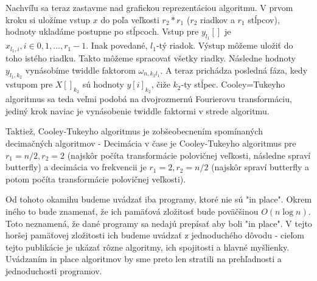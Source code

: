 Nachvíľu sa teraz zastavme nad grafickou reprezentáciou algoritmu.
V prvom kroku si uložíme vstup $x$ do poľa veľkosti $r_2*r_1$ ($r_2$ riadkov a
$r_1$ stĺpcov), hodnoty ukladáme postupne po stĺpcoch.
Vstup pre $y_{l_1}[]$ je $x_{l_1,i}, i\in0,1,\dots,r_1-1$. Inak
povedané, $l_1$-tý riadok. Výstup môžeme uložiť do toho istého riadku.
Takto môžeme spracovať všetky riadky.
Následne hodnoty $y_{l_1, k_2}$ vynásobíme twiddle faktorom
$\omega_{n, k_2 l_1}$.
A teraz prichádza posledná fáza, kedy vstupom pre
 $X[]_{k_2}$ sú hodnoty $y[i]_{k_2}$, čiže $k_2$-ty stĺpec.
Cooley=Tukeyho algoritmus sa teda veľmi podobá na dvojrozmernú
Fourierovu transformáciu, jediný krok naviac je vynásobenie twiddle
faktormi v strede algoritmu.

Taktiež, Cooley-Tukeyho algoritmus je zobšeobecnením spomínaných
decimačných algoritmov - Decimácia v čase je Cooley-Tukeyho algoritmus
pre $r_1 =n/2, r_2=2$ (najskôr počíta transformácie polovičnej
veľkosti, následne spraví butterfly) a decimácia vo frekvencii je
$r_1=2, r_2=n/2$ (najskôr spraví butterfly a potom počíta
transformácie polovičnej veľkosti).

\begin{poznamka}
    Od tohoto okamihu budeme uvádzať iba programy, ktoré nie sú 
    "in place". Okrem iného to bude znamenať, že ich pamäťová
    zložitosť bude poväčšinou $O(n \log n)$. Toto neznamená, že dané
    programy sa nedajú prepísať aby boli "in place". V tejto horšej
    pamäťovej zložitosti ich budeme uvádzať z jednoduchého dôvodu -
    cieľom tejto publikácie je ukázať rôzne algoritmy, ich spojitosti
    a hlavné myšlienky. Uvádzaním in place algoritmov by sme preto len
    stratili na prehľadnosti a jednoduchosti programov.
\end{poznamka}



